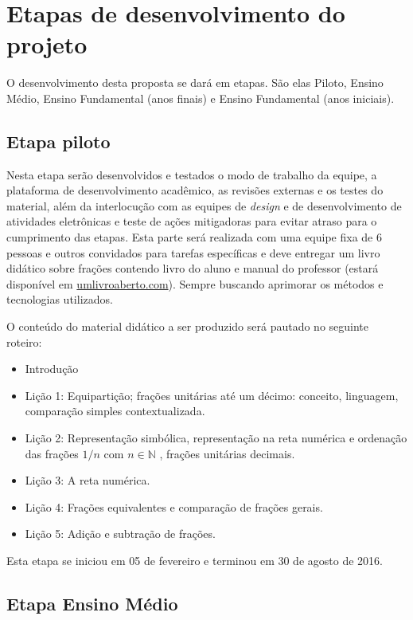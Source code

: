 \documentclass[10 pt]{article}
\begin{document}
\section{Etapas de desenvolvimento do projeto}
O desenvolvimento desta proposta se dará em etapas. São elas Piloto, Ensino Médio, Ensino Fundamental (anos finais) e Ensino Fundamental (anos iniciais).

\subsection{Etapa piloto}

Nesta etapa serão desenvolvidos e testados o modo de trabalho da equipe, a plataforma de desenvolvimento acadêmico, as revisões externas e os testes do material, além da interlocução com as equipes de {\it design} e de desenvolvimento de atividades eletrônicas e teste de ações mitigadoras para evitar atraso para o cumprimento das etapas. 
Esta parte será realizada com uma equipe fixa de 6 pessoas e outros convidados para tarefas específicas e deve entregar um livro didático sobre frações contendo livro do aluno e manual do professor (estará disponível em \href{http://umlivroaberto.com}{umlivroaberto.com}). 
Sempre buscando aprimorar os métodos e tecnologias utilizados.

O conteúdo do material didático a ser produzido será pautado no seguinte roteiro:

\begin{itemize} %
  \item     Introdução
  \item     Lição 1: Equipartição; frações unitárias até um décimo: conceito, linguagem, comparação simples contextualizada.
  \item     Lição 2: Representação simbólica, representação na reta numérica e ordenação das frações     $1/n$  com  $n \in \mathbb{N}$    , frações unitárias decimais.
  \item     Lição 3: A reta numérica.
  \item     Lição 4: Frações equivalentes e comparação de frações gerais.
  \item     Lição 5: Adição e subtração de frações.
\end{itemize} %

Esta etapa se iniciou em 05 de fevereiro e terminou em 30 de agosto de 2016.

\subsection{Etapa Ensino Médio}
\end{document}
